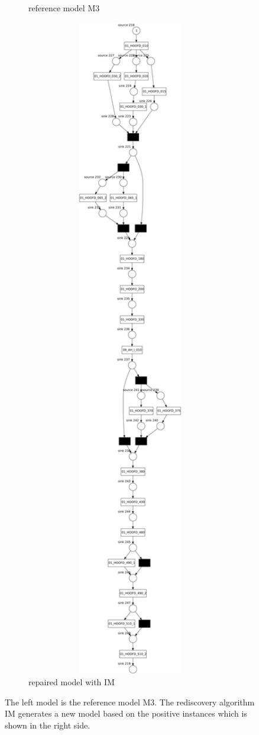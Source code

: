 \begin{figure}[htp]
\begin{subfigure}[b]{0.45\textwidth}
		\caption{reference model M3}
		\label{fig:rl_ref}
	\end{subfigure}%
\quad
\begin{subfigure}[b]{0.45\textwidth}
	\centering
\includegraphics[width=1.0\textwidth, height=0.9\textheight]{figures/evaluation/PN-result-D4-1-IM20-pos.pdf}
\caption{repaired model with IM}
\label{fig:rl_IM}
\end{subfigure}%
\caption[Reference model M3 and the rediscovered model for it with IM]{The left model is the reference model M3. The rediscovery algorithm IM generates a new model based on the positive instances which is shown in the right side.}
\end{figure}

